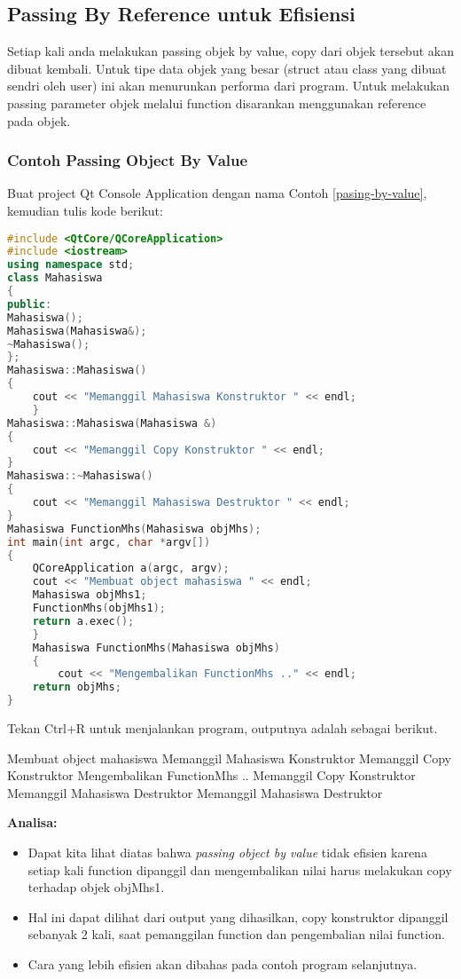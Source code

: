 \subsection{Passing By Reference untuk
Efisiensi}\label{passing-by-reference-untuk-efisiensi}

Setiap kali anda melakukan passing objek by value, copy dari objek
tersebut akan dibuat kembali. Untuk tipe data objek yang besar (struct
atau class yang dibuat sendri oleh user) ini akan menurunkan performa
dari program. Untuk melakukan passing parameter objek melalui function
disarankan menggunakan reference pada objek.

\subsubsection*{Contoh  Passing Object By Value}

Buat project Qt Console Application dengan nama Contoh \ref{pasing-by-value}, kemudian
tulis kode berikut:

\begin{lstlisting}[language=c++, caption=Passing Object By Value, label=pasing-by-value]
#include <QtCore/QCoreApplication>
#include <iostream>
using namespace std;
class Mahasiswa
{
public:
Mahasiswa();
Mahasiswa(Mahasiswa&);
~Mahasiswa();
};
Mahasiswa::Mahasiswa()
{
    cout << "Memanggil Mahasiswa Konstruktor " << endl;
    }
Mahasiswa::Mahasiswa(Mahasiswa &)
{
    cout << "Memanggil Copy Konstruktor " << endl;
}
Mahasiswa::~Mahasiswa()
{
    cout << "Memanggil Mahasiswa Destruktor " << endl;
}
Mahasiswa FunctionMhs(Mahasiswa objMhs);
int main(int argc, char *argv[])
{
    QCoreApplication a(argc, argv);
    cout << "Membuat object mahasiswa " << endl;
    Mahasiswa objMhs1;
    FunctionMhs(objMhs1);
    return a.exec();
    }
    Mahasiswa FunctionMhs(Mahasiswa objMhs)
    {
        cout << "Mengembalikan FunctionMhs .." << endl;
    return objMhs;
}
\end{lstlisting}

Tekan Ctrl+R untuk menjalankan program, outputnya adalah sebagai
berikut.

\begin{lcverbatim}
Membuat object mahasiswa
Memanggil Mahasiswa Konstruktor
Memanggil Copy Konstruktor
Mengembalikan FunctionMhs ..
Memanggil Copy Konstruktor
Memanggil Mahasiswa Destruktor
Memanggil Mahasiswa Destruktor
\end{lcverbatim}

\textbf{Analisa:}

\begin{itemize}

\item
  Dapat kita lihat diatas bahwa \emph{passing object by value} tidak
  efisien karena setiap kali function dipanggil dan mengembalikan nilai
  harus melakukan copy terhadap objek objMhs1.
\item
  Hal ini dapat dilihat dari output yang dihasilkan, copy konstruktor
  dipanggil sebanyak 2 kali, saat pemanggilan function dan pengembalian
  nilai function.
\item
  Cara yang lebih efisien akan dibahas pada contoh program selanjutnya.
\end{itemize}

